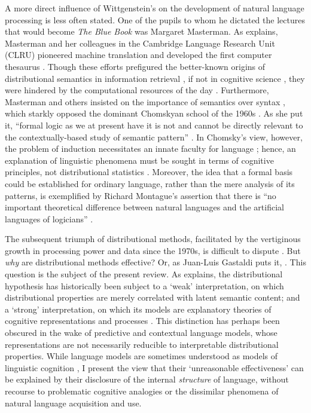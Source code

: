 A more direct influence of Wittgenstein's on the development of natural language
processing is less often stated.
One of the pupils to whom he dictated the lectures that would become \emph{The Blue
  Book} \parencites*{Wittgenstein2007} was Margaret Masterman.
As \textcites{Liu2021} explains, Masterman and her colleagues in the Cambridge Language
Research Unit (CLRU) pioneered machine translation and developed the first computer
thesaurus \parencites[653]{Gavin2018}.
Though these efforts prefigured the better-known origins of distributional semantics in
information retrieval \parencites[143-144]{Turney2010}[655-657]{Gavin2018}, if not in
cognitive science \parencites[14-15]{Lenci2023}, they were hindered by the
computational resources of the day \parencites[438]{Liu2021}.
Furthermore, Masterman and others insisted on the importance of semantics over syntax
\parencites[430]{Liu2021}, which starkly opposed the dominant Chomskyan school of the
1960s \parencites[281-282]{Wilks2000}[5]{Lenci2008}.
As she put it, ``formal logic as we at present have it is not and cannot be directly
relevant to the contextually-based study of semantic pattern'' \parencites[IV
  p\period~12]{Masterman1965}.
In Chomsky's view, however, the problem of induction necessitates an innate faculty for
language \parencites[e.g.][574-578]{Moyal-Sharrock2017}; hence, an explanation of
linguistic phenomena must be sought in terms of cognitive principles, not
distributional statistics \parencites[p. 5; cf. pp. 16--17]{Lenci2008}.
Moreover, the idea that a formal basis could be established for ordinary language,
rather than the mere analysis of its patterns, is exemplified by Richard Montague's
assertion that there is ``no important theoretical difference between natural languages
and the artificial languages of logicians'' \parencites*[222]{Montague1974}.

The subsequent triumph of distributional methods, facilitated by the vertiginous growth
in processing power and data since the 1970s, is difficult to dispute
\parencites{Leiserson2020}[361-362]{Lenci2023}.
But \emph{why} are distributional methods effective?
Or, as Juan-Luis Gastaldi \parencite*{Gastaldi2021} puts it, .
This question is the subject of the present review.
As \textcites[3,14-18]{Lenci2008} explains, the distributional hypothesis has
historically been subject to a `weak' interpretation, on which distributional
properties are merely correlated with latent semantic content; and a `strong'
interpretation, on which its models are explanatory theories of cognitive
representations and processes \parencites[see][]{Gunther2019}.
This distinction has perhaps been obscured in the wake of predictive and contextual
language models, whose representations are not necessarily reducible to interpretable
distributional properties.
While language models are sometimes understood as models of linguistic cognition
\parencites{Houghton2023}, I present the view that their `unreasonable effectiveness'
\parencites{Karpathy2015} can be explained by their disclosure of the internal
\emph{structure} of language, without recourse to problematic cognitive analogies or
the dissimilar phenomena of natural language acquisition and use.

